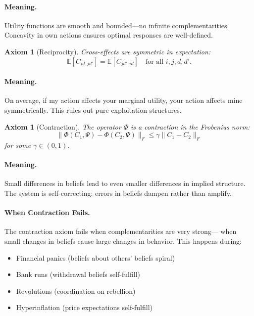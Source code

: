 \documentclass[12pt,a4paper]{article}
\newtheorem{axiom}[theorem]{Axiom}
\begin{document}
\paragraph{Meaning.}
Utility functions are smooth and bounded---no infinite complementarities.
Concavity in own actions ensures optimal responses are well-defined.

\begin{axiom}[Reciprocity]
\label{ax:reciprocity}
Cross-effects are symmetric in expectation:
\[
  \mathbb{E}[C_{id,jd'}] = \mathbb{E}[C_{jd',id}]
  \quad \text{for all } i,j,d,d'.
\]
\end{axiom}

\paragraph{Meaning.}
On average, if my action affects your marginal utility,
your action affects mine symmetrically.
This rules out pure exploitation structures.

\begin{axiom}[Contraction]
\label{ax:contraction}
The operator $\Phi$ is a contraction in the Frobenius norm:
\[
  \|\Phi(C_1, \Psi) - \Phi(C_2, \Psi)\|_F \leq \gamma \|C_1 - C_2\|_F
\]
for some $\gamma \in (0,1)$.
\end{axiom}

\paragraph{Meaning.}
Small differences in beliefs lead to even smaller differences in implied structure.
The system is self-correcting: errors in beliefs dampen rather than amplify.

\paragraph{When Contraction Fails.}
The contraction axiom fails when complementarities are very strong---
when small changes in beliefs cause large changes in behavior.
This happens during:
\begin{itemize}
  \item Financial panics (beliefs about others' beliefs spiral)
  \item Bank runs (withdrawal beliefs self-fulfill)
  \item Revolutions (coordination on rebellion)
  \item Hyperinflation (price expectations self-fulfill)
\end{itemize}
\end{document}

